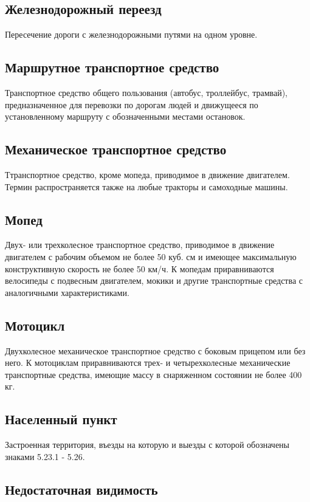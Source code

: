 \documentclass[russian,english,12pt,a4paper,reqno,dviphfm,oneside]{book}
\begin{document}
{\subsection{Железнодорожный переезд}
Пересечение дороги с железнодорожными путями на одном уровне.

\subsection{Маршрутное транспортное средство}
Транспортное средство общего пользования (автобус, троллейбус, трамвай), предназначенное для перевозки по дорогам людей и движущееся по установленному маршруту с обозначенными местами остановок.

\subsection{Механическое транспортное средство}
Ттранспортное средство, кроме мопеда, приводимое в движение двигателем. Термин распространяется также на любые тракторы и самоходные машины.

\subsection{Мопед}
Двух- или трехколесное транспортное средство, приводимое в движение двигателем с рабочим объемом не более 50 куб. см и имеющее максимальную конструктивную скорость не более 50 км/ч. К мопедам приравниваются велосипеды с подвесным двигателем, мокики и другие транспортные средства с аналогичными характеристиками.

\subsection{Мотоцикл}
Двухколесное механическое транспортное средство с боковым прицепом или без него. К мотоциклам приравниваются трех- и четырехколесные механические транспортные средства, имеющие массу в снаряженном состоянии не более 400 кг.

\subsection{Населенный пункт}
Застроенная территория, въезды на которую и выезды с которой обозначены знаками 5.23.1 - 5.26.

\subsection{Недостаточная видимость}

}
\end{document}
